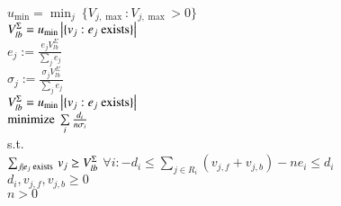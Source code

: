 \begin{AlgFloat}[H]
\begin{Algorithm}[FALCON]
\label{alg:FALCON}
\begin{algorithmic}
~\\
$u_{\min} = \min_j\ \{V_{j,\max} : V_{j,\max} > 0\}$\\
$V_{lb}^{\Sigma} = u_{\min} \left|\{v_j : e_j \textnormal{ exists}\}\right|$\\
  \STATE $e_j := \frac{e_j V_{lb}^{\Sigma}}
    {\sum\limits_{j} e_j}$\\ 
  \STATE $\sigma_j := \frac{\sigma_j V_{lb}^{\Sigma}}
    {\sum\limits_{j} e_j}$\\ 
\ENDFOR
{}
  \STATE $V_{lb}^{\Sigma} = u_{\min} \left|\{v_j : 
    e_j \textnormal{ exists}\}\right|$\\
  \INDSTATE $\textnormal{minimize}\ \sum\limits_i \frac{d_i}{n
    \sigma_i}$ \\
  \INDSTATE s.t. \\
  \INDSTATE $\sum_{j \mid e_j \textnormal{ exists }} v_j \geq V_{lb}^{\Sigma}$ 
  \INDSTATE $\forall i: -d_i \leq \sum\nolimits_{j \in R_i} (v_{j,f} +
    v_{j,b}) - n e_i \leq d_i$ \\
  \INDSTATE $d_i, v_{j,f}, v_{j,b} \geq 0$ \\
  \INDSTATE $n > 0$
  \ENDFOR
\ENDWHILE
\end{algorithmic}
\end{Algorithm}
\end{AlgFloat}


